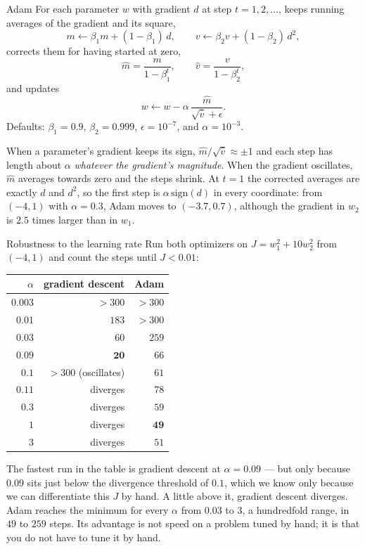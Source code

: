 \begin{defbox}{Adam}
For each parameter $w$ with gradient $d$ at step $t = 1, 2, \dots$, 
keeps running averages of the gradient and its square,
\[
  m \leftarrow \beta_1 m + (1-\beta_1)\,d, \qquad
  v \leftarrow \beta_2 v + (1-\beta_2)\,d^2,
\]
corrects them for having started at zero,
\[
  \hat m = \frac{m}{1-\beta_1^t}, \qquad \hat v = \frac{v}{1-\beta_2^t},
\]
and updates
\[
  w \leftarrow w - \alpha\,\frac{\hat m}{\sqrt{\hat v} + \epsilon} .
\]
Defaults: $\beta_1 = 0.9$, $\beta_2 = 0.999$, $\epsilon = 10^{-7}$, and
$\alpha = 10^{-3}$.
\end{defbox}

When a parameter's gradient keeps its sign, $\hat m/\sqrt{\hat v} \approx \pm1$
and each step has length about $\alpha$ \emph{whatever the gradient's
magnitude}. When the gradient oscillates, $\hat m$ averages towards zero and the
steps shrink. At $t = 1$ the corrected averages are exactly $d$ and $d^2$, so the
first step is $\alpha\,\mathrm{sign}(d)$ in every coordinate: from $(-4, 1)$ with
$\alpha = 0.3$, Adam moves to $(-3.7, 0.7)$, although the gradient in $w_2$ is
$2.5$ times larger than in $w_1$.

\begin{workedexample}{Robustness to the learning rate}
Run both optimizers on $J = w_1^2 + 10w_2^2$ from $(-4, 1)$ and count the steps
until $J < 0.01$:

\begin{center}
\small
\renewcommand{\arraystretch}{1.15}
\begin{tabular}{@{}rrr@{}}
\toprule
$\alpha$ & gradient descent & Adam\\
\midrule
$0.003$ & $> 300$  & $> 300$\\
$0.01$  & $183$    & $> 300$\\
$0.03$  & $60$     & $259$\\
$0.09$  & $\mathbf{20}$ & $66$\\
$0.1$   & $> 300$ (oscillates) & $61$\\
$0.11$  & diverges & $78$\\
$0.3$   & diverges & $59$\\
$1$     & diverges & $\mathbf{49}$\\
$3$     & diverges & $51$\\
\bottomrule
\end{tabular}
\end{center}

The fastest run in the table is gradient descent at $\alpha = 0.09$ --- but only
because $0.09$ sits just below the divergence threshold of $0.1$, which we know
only because we can differentiate this $J$ by hand. A little above it, gradient
descent diverges. Adam reaches the minimum for every $\alpha$ from $0.03$ to $3$,
a hundredfold range, in $49$ to $259$ steps. Its advantage is not speed on a
problem tuned by hand; it is that you do not have to tune it by hand.
\end{workedexample}

